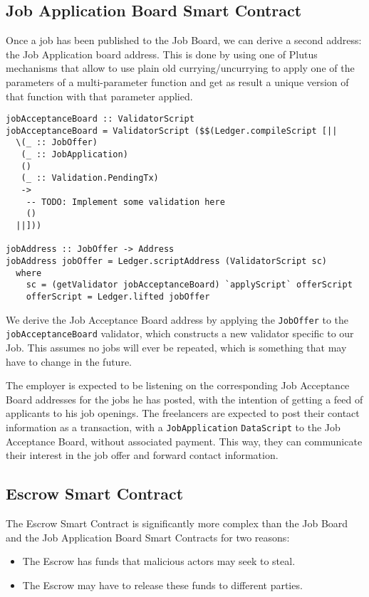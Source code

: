 \documentclass{article}
\begin{document}
\subsection{Job Application Board Smart Contract}
Once a job has been published to the Job Board, we can derive a second address: the Job Application board address. This is done by using one of Plutus mechanisms that allow to use plain old currying/uncurrying to apply one of the parameters of a multi-parameter function and get as result a unique version of that function with that parameter applied.

\begin{samepage}
\begin{verbatim}
jobAcceptanceBoard :: ValidatorScript
jobAcceptanceBoard = ValidatorScript ($$(Ledger.compileScript [||
  \(_ :: JobOffer)
   (_ :: JobApplication)
   ()
   (_ :: Validation.PendingTx)
   ->
    -- TODO: Implement some validation here
    ()
  ||]))

jobAddress :: JobOffer -> Address
jobAddress jobOffer = Ledger.scriptAddress (ValidatorScript sc)
  where
    sc = (getValidator jobAcceptanceBoard) `applyScript` offerScript
    offerScript = Ledger.lifted jobOffer
\end{verbatim}
\end{samepage}

We derive the Job Acceptance Board address by applying the \verb|JobOffer| to the \verb|jobAcceptanceBoard| validator, which constructs a new validator specific to our Job. This assumes no jobs will ever be repeated, which is something that may have to change in the future.

The employer is expected to be listening on the corresponding Job Acceptance Board addresses for the jobs he has posted, with the intention of getting a feed of applicants to his job openings. The freelancers are expected to post their contact information as a transaction, with a \verb|JobApplication| \verb|DataScript| to the Job Acceptance Board, without associated payment. This way, they can communicate their interest in the job offer and forward contact information.

\subsection{Escrow Smart Contract}
The Escrow Smart Contract is significantly more complex than the Job Board and the Job Application Board Smart Contracts for two reasons:

\begin{itemize}
  \item The Escrow has funds that malicious actors may seek to steal.
  \item The Escrow may have to release these funds to different parties.
\end{itemize}
\end{document}
